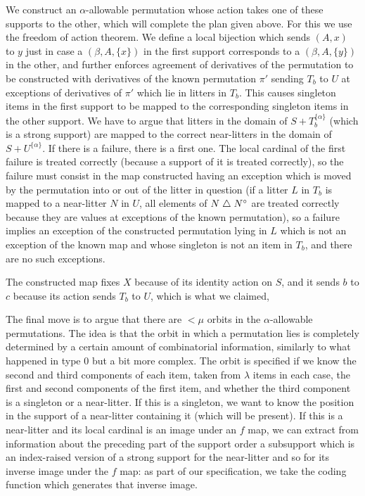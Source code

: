 We construct an $\alpha$-allowable permutation whose action takes one of these supports to the other, which will complete the plan given above.
For this we use the freedom of action theorem.  We define a local bijection which sends $(A,x)$ to $y$ just in case a $(\beta,A,\{x\})$ in the first support corresponds to a $(\beta,A,\{y\})$ in the other, and further enforces agreement of derivatives  of the permutation to be constructed with derivatives of the known permutation $\pi'$ sending $T_b$ to $U$ at exceptions of derivatives of $\pi'$ which lie in litters in $T_b$.  This causes singleton items in the first support to be mapped to the corresponding singleton items in the other support.  We have to argue that litters in the domain of $S+T_b^{\{\alpha\}}$ (which is a strong support) are mapped to the correct near-litters in the domain of $S+U^{\{\alpha\}}$.  If there is a failure, there is a first one.  The local cardinal of the first failure is treated correctly (because a support of it is treated correctly), so the failure must consist in the map constructed having an exception which is moved by the permutation into or out of the litter in question (if a litter $L$ in $T_b$ is mapped to a near-litter $N$ in $U$, all elements of $N \mathrel{\triangle} N^\circ$ are treated correctly because they are values at exceptions of the known permutation), so a failure implies an exception of the constructed permutation lying in $L$ which is not an exception of the known map and whose singleton is not an item in $T_b$, and there are no such exceptions.

The constructed map fixes $X$ because of its identity action on $S$, and it sends $b$ to $c$ because its action sends $T_b$ to $U$, which is what we claimed,

The final move is to argue that there are $<\mu$ orbits in the $\alpha$-allowable permutations.  The idea is that the orbit in which a permutation lies
is completely determined by a certain amount of combinatorial information, similarly to what happened in type 0 but a bit more complex.  The orbit is specified if we know the second and third components of each item, taken from $\lambda$ items in each case, the first and second components of the first item, and whether the third component is a singleton or a near-litter.  If this is a singleton, we want to know the position in the support of a near-litter containing it (which will be present).  If this is a near-litter and its local cardinal is an image under an $f$ map, we can extract from information about the preceding part of the support order a subsupport which is an index-raised version of a strong support for the near-litter and so for its inverse image under the $f$ map:  as part of our specification, we take the coding function which generates that inverse image.

